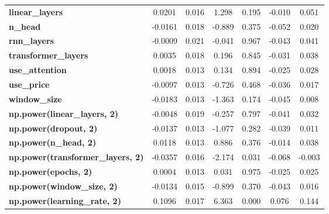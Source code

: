 \begin{center}
\begin{tabular}{lcccccc}
\textbf{linear\_layers}                   &       0.0201  &        0.016     &     1.298  &         0.195        &       -0.010    &        0.051     \\
\textbf{n\_head}                          &      -0.0161  &        0.018     &    -0.889  &         0.375        &       -0.052    &        0.020     \\
\textbf{rnn\_layers}                      &      -0.0009  &        0.021     &    -0.041  &         0.967        &       -0.043    &        0.041     \\
\textbf{transformer\_layers}              &       0.0035  &        0.018     &     0.196  &         0.845        &       -0.031    &        0.038     \\
\textbf{use\_attention}                   &       0.0018  &        0.013     &     0.134  &         0.894        &       -0.025    &        0.028     \\
\textbf{use\_price}                       &      -0.0097  &        0.013     &    -0.726  &         0.468        &       -0.036    &        0.017     \\
\textbf{window\_size}                     &      -0.0183  &        0.013     &    -1.363  &         0.174        &       -0.045    &        0.008     \\
\textbf{np.power(linear\_layers, 2)}      &      -0.0048  &        0.019     &    -0.257  &         0.797        &       -0.041    &        0.032     \\
\textbf{np.power(dropout, 2)}             &      -0.0137  &        0.013     &    -1.077  &         0.282        &       -0.039    &        0.011     \\
\textbf{np.power(n\_head, 2)}             &       0.0118  &        0.013     &     0.886  &         0.376        &       -0.014    &        0.038     \\
\textbf{np.power(transformer\_layers, 2)} &      -0.0357  &        0.016     &    -2.174  &         0.031        &       -0.068    &       -0.003     \\
\textbf{np.power(epochs, 2)}              &       0.0004  &        0.013     &     0.031  &         0.975        &       -0.025    &        0.025     \\
\textbf{np.power(window\_size, 2)}        &      -0.0134  &        0.015     &    -0.899  &         0.370        &       -0.043    &        0.016     \\
\textbf{np.power(learning\_rate, 2)}      &       0.1096  &        0.017     &     6.363  &         0.000        &        0.076    &        0.144     \\

\end{tabular}
\end{center}
